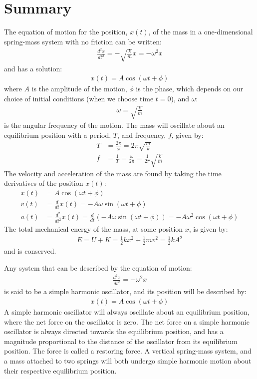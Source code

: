 \section{Summary}
\vspace{-0.25cm}
\begin{chapterSummary}
The equation of motion for the position, $x(t)$, of the mass in a one-dimensional spring-mass system with no friction can be written:
\begin{align*}
\frac{d^2x}{dt^2}=-\sqrt{\frac{k}{m}}x = -\omega^2 x
\end{align*}
and has a solution:
\begin{align*}
x(t) = A\cos(\omega t + \phi)
\end{align*}
where $A$ is the amplitude of the motion, $\phi$ is the phase, which depends on our choice of initial conditions (when we choose time $t=0$), and $\omega$:
\begin{align*}
\omega = \sqrt{\frac{k}{m}}
\end{align*}
is the angular frequency of the motion. The mass will oscillate about an equilibrium position with a period, $T$, and frequency, $f$, given by:
\begin{align*}
T&=\frac{2\pi}{\omega}=2\pi\sqrt{\frac{m}{k}}\\
f&=\frac{1}{T}=\frac{\omega}{2\pi}=\frac{1}{2\pi}\sqrt{\frac{k}{m}}
\end{align*}
The velocity and acceleration of the mass are found by taking the time derivatives of the position $x(t)$:
\begin{align*}
x(t)&= A \cos(\omega t + \phi)\\
v(t)&=\frac{d}{dt}x(t) = -A\omega\sin(\omega t + \phi)\\
a(t)&= \frac{d^2}{dt^2}x(t) =\frac{d}{dt}\left( -A\omega\sin(\omega t + \phi)\right)= -A\omega^2\cos(\omega t + \phi)
\end{align*}
The total mechanical energy of the mass, at some position $x$, is given by:
\begin{align*}
E =U+K=\frac{1}{2}kx^2+\frac{1}{2}mv^2= \frac{1}{2}kA^2
\end{align*}
and is conserved. 

Any system that can be described by the equation of motion:
\begin{align*}
\frac{d^2x}{dt^2}= -\omega^2 x
\end{align*}
is said to be a simple harmonic oscillator, and its position will be described by:
\begin{align*}
x(t) = A\cos(\omega t + \phi)
\end{align*}
A simple harmonic oscillator will always oscillate about an equilibrium position, where the net force on the oscillator is zero. The net force on a simple harmonic oscillator is always directed towards the equilibrium position, and has a magnitude proportional to the distance of the oscillator from its equilibrium position. The force is called a restoring force. A vertical spring-mass system, and a mass attached to two springs will both undergo simple harmonic motion about their respective equilibrium position.


\end{chapterSummary}
